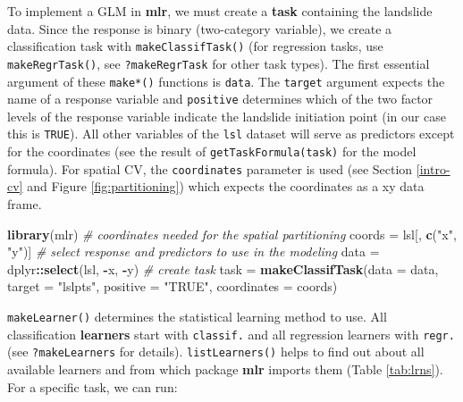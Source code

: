 \documentclass[]{krantz}
\newenvironment{Shaded}{\begin{snugshade}}{\end{snugshade}}
\newcommand{\CommentTok}[1]{\textcolor[rgb]{0.37,0.37,0.37}{\textit{#1}}}
\newcommand{\DataTypeTok}[1]{\textcolor[rgb]{0.27,0.27,0.27}{#1}}
\newcommand{\KeywordTok}[1]{\textcolor[rgb]{0.27,0.27,0.27}{\textbf{#1}}}
\newcommand{\NormalTok}[1]{#1}
\newcommand{\OperatorTok}[1]{\textcolor[rgb]{0.43,0.43,0.43}{\textbf{#1}}}
\newcommand{\OtherTok}[1]{\textcolor[rgb]{0.37,0.37,0.37}{#1}}
\newcommand{\StringTok}[1]{\textcolor[rgb]{0.5,0.5,0.5}{#1}}
\begin{document}
To implement a GLM in \textbf{mlr}, we must create a \textbf{task} containing the landslide data.
Since the response is binary (two-category variable), we create a classification task with \texttt{makeClassifTask()} (for regression tasks, use \texttt{makeRegrTask()}, see \texttt{?makeRegrTask} for other task types).
The first essential argument of these \texttt{make*()} functions is \texttt{data}.
The \texttt{target} argument expects the name of a response variable and \texttt{positive} determines which of the two factor levels of the response variable indicate the landslide initiation point (in our case this is \texttt{TRUE}).
All other variables of the \texttt{lsl} dataset will serve as predictors except for the coordinates (see the result of \texttt{getTaskFormula(task)} for the model formula).
For spatial CV, the \texttt{coordinates} parameter is used (see Section \ref{intro-cv} and Figure \ref{fig:partitioning}) which expects the coordinates as a xy data frame.

\begin{Shaded}
\begin{Highlighting}[]
\KeywordTok{library}\NormalTok{(mlr)}
\CommentTok{# coordinates needed for the spatial partitioning}
\NormalTok{coords =}\StringTok{ }\NormalTok{lsl[, }\KeywordTok{c}\NormalTok{(}\StringTok{"x"}\NormalTok{, }\StringTok{"y"}\NormalTok{)]}
\CommentTok{# select response and predictors to use in the modeling}
\NormalTok{data =}\StringTok{ }\NormalTok{dplyr}\OperatorTok{::}\KeywordTok{select}\NormalTok{(lsl, }\OperatorTok{-}\NormalTok{x, }\OperatorTok{-}\NormalTok{y)}
\CommentTok{# create task}
\NormalTok{task =}\StringTok{ }\KeywordTok{makeClassifTask}\NormalTok{(}\DataTypeTok{data =}\NormalTok{ data, }\DataTypeTok{target =} \StringTok{"lslpts"}\NormalTok{,}
                       \DataTypeTok{positive =} \StringTok{"TRUE"}\NormalTok{, }\DataTypeTok{coordinates =}\NormalTok{ coords)}
\end{Highlighting}
\end{Shaded}

\texttt{makeLearner()} determines the statistical learning method to use.
All classification \textbf{learners} start with \texttt{classif.} and all regression learners with \texttt{regr.} (see \texttt{?makeLearners} for details).
\texttt{listLearners()} helps to find out about all available learners and from which package \textbf{mlr} imports them (Table \ref{tab:lrns}).
For a specific task, we can run:

\begin{Shaded}
\end{Shaded}
\end{document}
